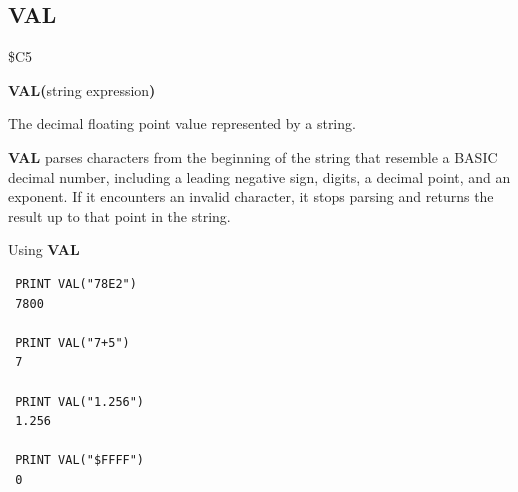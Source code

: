 
\newpage
\subsection{VAL}
\begin{description}[leftmargin=2cm,style=nextline]
\item [Token:] \$C5
\item [Format:] {\bf VAL(}string expression{\bf)}
\item [Returns:] The decimal floating point value represented by a string.

\item [Remarks:] {\bf VAL} parses characters from the beginning of the string
               that resemble a BASIC decimal number, including a leading
               negative sign, digits, a decimal point, and an exponent. If it
               encounters an invalid character, it stops parsing and returns
               the result up to that point in the string.

\item [Example:] Using {\bf VAL}
\begin{tcolorbox}[colback=black,coltext=white]
\verbatimfont{\codefont}
\begin{verbatim}
 PRINT VAL("78E2")
 7800

 PRINT VAL("7+5")
 7

 PRINT VAL("1.256")
 1.256

 PRINT VAL("$FFFF")
 0
\end{verbatim}
\end{tcolorbox}
\end{description}


\newpage
